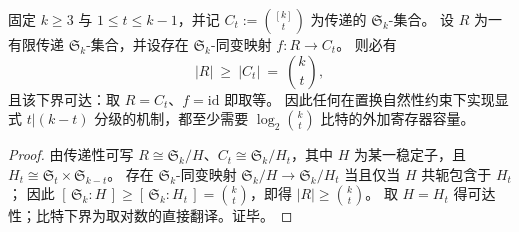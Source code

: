 \begin{proposition}\label{prop:bdry-equvariant-register-min-degree-choose}
固定 \(k\ge 3\) 与 \(1\le t\le k-1\)，并记 \(C_t:=\binom{[k]}{t}\) 为传递的 \(\mathfrak S_k\)-集合。
设 \(R\) 为一有限传递 \(\mathfrak S_k\)-集合，并设存在 \(\mathfrak S_k\)-同变映射 \(f:R\to C_t\)。
则必有
\[
|R|\ \ge\ |C_t|\ =\ \binom{k}{t},
\]
且该下界可达：取 \(R=C_t\)、\(f=\mathrm{id}\) 即取等。
因此任何在置换自然性约束下实现显式 \(t|(k-t)\) 分级的机制，都至少需要 \(\log_2\binom{k}{t}\) 比特的外加寄存器容量。
\end{proposition}
\begin{proof}
由传递性可写 \(R\cong \mathfrak S_k/H\)、\(C_t\cong \mathfrak S_k/H_t\)，其中 \(H\) 为某一稳定子，且 \(H_t\cong \mathfrak S_t\times \mathfrak S_{k-t}\)。
存在 \(\mathfrak S_k\)-同变映射 \(\mathfrak S_k/H\to \mathfrak S_k/H_t\) 当且仅当 \(H\) 共轭包含于 \(H_t\)；
因此 \([\,\mathfrak S_k:H\,]\ge [\,\mathfrak S_k:H_t\,]=\binom{k}{t}\)，即得 \(|R|\ge \binom{k}{t}\)。
取 \(H=H_t\) 得可达性；比特下界为取对数的直接翻译。证毕。
\end{proof}


\endinput
